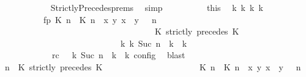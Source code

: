\begin{isabellebody}
\ \ \ \ \ \ \ \ \ \ \isamarkupfalse%
\ \ StrictlyPrecedes{\isachardot}prems\ \isamarkupfalse%
\ simp\isanewline
\ \ \ \ \ \ \ \ \isamarkupfalse%
\ this\ \isamarkupfalse%
\ {\isasymGamma}\isactrlsub k\ {\isasymPsi}\isactrlsub k\ {\isasymPhi}\isactrlsub k\ k\isanewline
\ \ \ \ \ \ \ \ \ \ \ fp{\isacharcolon}{\isacartoucheopen}{\isacharparenleft}{\isacharparenleft}{\isacharparenleft}{\isasymlceil}{\isacharhash}\isactrlsup {\isasymle}\ K\ n{\isacharcomma}\ {\isacharhash}\isactrlsup {\isacharless}\ K\ n{\isasymrceil}\ {\isasymin}\ {\isacharparenleft}{\isasymlambda}{\isacharparenleft}x{\isacharcomma}\ y{\isacharparenright}{\isachardot}\ x\ {\isasymle}\ y{\isacharparenright}{\isacharparenright}\ {\isacharhash}\ {\isasymGamma}{\isacharparenright}{\isacharcomma}\ n\isanewline
\ \ \ \ \ \ \ \ \ \ \ \ \ \ \ \ \ \ \ \ \ \ \ \ \ \ \ \ \ \ \ \ \ \ {\isasymturnstile}\ {\isasymPsi}\ {\isasymtriangleright}\ {\isacharparenleft}{\isacharparenleft}K\ strictly\ precedes\ K\ {\isacharhash}\ {\isasymPhi}{\isacharparenright}{\isacharparenright}\isanewline
\ \ \ \ \ \ \ \ \ \ \ \ \ \ \ \ \ \ \ \ \ \ \ \ \ \ \ \ \ {\isasymhookrightarrow}\isactrlbsup k\isactrlesup \ {\isacharparenleft}{\isasymGamma}\isactrlsub k{\isacharcomma}\ Suc\ n\ {\isasymturnstile}\ {\isasymPsi}\isactrlsub k\ {\isasymtriangleright}\ {\isasymPhi}\isactrlsub k{\isacharparenright}{\isacartoucheclose}\isanewline
\ \ \ \ \ \ \ \ \ \ \ \ \ rc{\isacharcolon}{\isacartoucheopen}{\isasymrho}\ {\isasymin}\ {\isasymlbrakk}\ {\isasymGamma}\isactrlsub k{\isacharcomma}\ Suc\ n\ {\isasymturnstile}\ {\isasymPsi}\isactrlsub k\ {\isasymtriangleright}\ {\isasymPhi}\isactrlsub k\ {\isasymrbrakk}\isactrlsub c\isactrlsub o\isactrlsub n\isactrlsub f\isactrlsub i\isactrlsub g{\isacartoucheclose}\ \isamarkupfalse%
\ blast\isanewline
\ \ \ \ \ \ \ \ \isamarkupfalse%
\ {\isacartoucheopen}{\isacharparenleft}{\isasymGamma}{\isacharcomma}\ n\ {\isasymturnstile}\ {\isacharparenleft}{\isacharparenleft}K\ strictly\ precedes\ K\ {\isacharhash}\ {\isasymPsi}{\isacharparenright}\ {\isasymtriangleright}\ {\isasymPhi}{\isacharparenright}\isanewline
\ \ \ \ \ \ \ \ \ \ \ \ \ \ \ \ {\isasymhookrightarrow}\ {\isacharparenleft}{\isacharparenleft}{\isacharparenleft}{\isasymlceil}{\isacharhash}\isactrlsup {\isasymle}\ K\ n{\isacharcomma}\ {\isacharhash}\isactrlsup {\isacharless}\ K\ n{\isasymrceil}\ {\isasymin}\ {\isacharparenleft}{\isasymlambda}{\isacharparenleft}x{\isacharcomma}\ y{\isacharparenright}{\isachardot}\ x\ {\isasymle}\ y{\isacharparenright}{\isacharparenright}\ {\isacharhash}\ {\isasymGamma}{\isacharparenright}{\isacharcomma}\ n\isanewline

\end{isabellebody}
